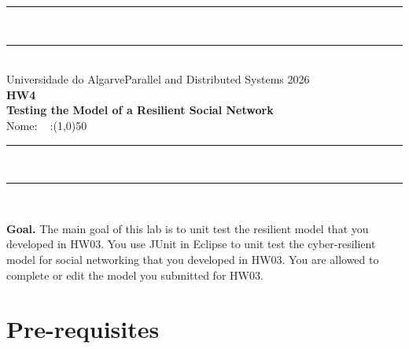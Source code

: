 \documentclass{article} %
\begin{document}
\begin{center}
\rule{\textwidth}{.0075in} \\
\rule[3mm]{\textwidth}{.0075in}\\

Universidade do Algarve\hfill Parallel and Distributed Systems \hfill 2026\\[3ex]

{\Large\bf HW4 \\ \medskip Testing the Model of a Resilient Social Network} \\[3ex]

\vspace*{0.30cm} Nome: 
   \ %
  \textnumero:\line(1,0){50}

\rule{\textwidth}{.0075in} \\
\rule[3mm]{\textwidth}{.0075in} \\
\end{center}

\bigskip

\noindent
\textbf{Goal.} The main goal of this lab is to unit test the resilient model that you developed in HW03. You use JUnit in Eclipse to unit test the cyber-resilient model for social networking that you developed in HW03. You are allowed to complete or edit the model you submitted for HW03.


\section{Pre-requisites}
\label{sec_pre}
\end{document}
